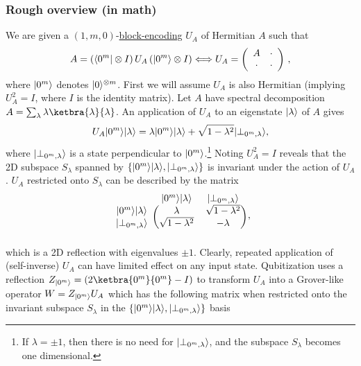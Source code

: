 \begin{refsection}

\subsubsection*{Rough overview (in math)}
We are given a $(1, m, 0)$-\hyperref[prim:BlockEncodings]{block-encoding} $U_A$ of Hermitian $A$ such that
\begin{equation*}
    A= \left(\langle0^m\rvert \otimes I \right) U_A \left(\lvert0^m\rangle \otimes I \right)\Longleftrightarrow U_A = \left(\begin{array}{cc} A & \cdot \\ \cdot & \cdot    \end{array}\right)\,,
\end{equation*}
where $\lvert0^m\rangle$ denotes $\lvert0\rangle^{\otimes m}$. 
First we will assume $U_A$ is also Hermitian (implying $U_A^2 = I$, where $I$ is the identity matrix).
Let $A$ have spectral decomposition $A = \sum_\lambda \lambda \ketbra{\lambda}{\lambda}$. An application of $U_A$ to an eigenstate $\lvert\lambda\rangle$ of $A$ gives
\begin{equation}
    U_A \lvert0^m\rangle \lvert\lambda\rangle = \lambda \lvert0^m\rangle \lvert\lambda\rangle + \sqrt{1-\lambda^2} \lvert\perp_{0^m, \lambda}\rangle,
\end{equation}
where $\lvert\perp_{0^m, \lambda}\rangle$ is a state perpendicular to $\lvert0^m\rangle$.\footnote{If $\lambda=\pm 1$, then there is no need for $\lvert\perp_{0^m, \lambda}\rangle$, and the subspace $S_\lambda$ becomes one dimensional.} Noting $U_A^2=I$ reveals that the 2D subspace $S_\lambda$ spanned by $\{  \lvert0^m\rangle\lvert\lambda\rangle, \lvert\perp_{0^m, \lambda}\rangle \}$ is invariant under the action of $U_A$. $U_A$ restricted onto $S_\lambda$ can be described by the matrix
\begin{align*}
\begin{blockarray}{ccc}
& \ket{0^m}\ket{\lambda}  &  \ket{\perp_{0^m, \lambda}} \\
\begin{block}{c(cc)}
  \ket{0^m}\ket{\lambda} & \lambda & \sqrt{1-\lambda^2} \\
   \ket{\perp_{0^m, \lambda}} & \sqrt{1-\lambda^2} & -\lambda \\
\end{block}
\end{blockarray}\,,
\end{align*}
which is a 2D reflection with eigenvalues $\pm 1$. Clearly, repeated application of (self-inverse) $U_A$ can have limited effect on any input state. Qubitization uses a reflection $Z_{\ket{0^m}} = (2\ketbra{0^m}{0^m} - I)$ to transform $U_A$ into a Grover-like operator $W = Z_{\lvert0^m\rangle} U_A$ which has the following matrix when restricted onto the invariant subspace $S_\lambda$ in the $\{  \lvert0^m\rangle\lvert\lambda\rangle, \lvert\perp_{0^m, \lambda}\rangle \}$ basis

\end{refsection}
